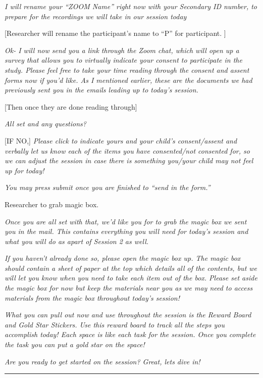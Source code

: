 \documentclass[]{book}
\begin{document}
\emph{I will rename your ``ZOOM Name'' right now with your Secondary ID number, to prepare for the recordings we will take in our session today}

{[}Researcher will rename the participant's name to ``P'' for participant. {]}

\emph{Ok- I will now send you a link through the Zoom chat, which will open up a survey that allows you to virtually indicate your consent to participate in the study. Please feel free to take your time reading through the consent and assent forms now if you'd like. As I mentioned earlier, these are the documents we had previously sent you in the emails leading up to today's session.}

{[}Then once they are done reading through{]}

\emph{All set and any questions?}

{[}IF NO,{]} \emph{Please click to indicate yours and your child's consent/assent and verbally let us know each of the items you have consented/not consented for, so we can adjust the session in case there is something you/your child may not feel up for today!}

\emph{You may press submit once you are finished to ``send in the form.''}

Researcher to grab magic box.

\emph{Once you are all set with that, we'd like you for to grab the magic box we sent you in the mail. This contains everything you will need for today's session and what you will do as apart of Session 2 as well.}

\emph{If you haven't already done so, please open the magic box up. The magic box should contain a sheet of paper at the top which details all of the contents, but we will let you know when you need to take each item out of the box. Please set aside the magic box for now but keep the materials near you as we may need to access materials from the magic box throughout today's session!}

\emph{What you can pull out now and use throughout the session is the Reward Board and Gold Star Stickers. Use this reward board to track all the steps you accomplish today! Each space is like each task for the session. Once you complete the task you can put a gold star on the space!}

\emph{Are you ready to get started on the session? Great, lets dive in!}

\begin{center}\rule{0.5\linewidth}{0.5pt}\end{center}
\end{document}
